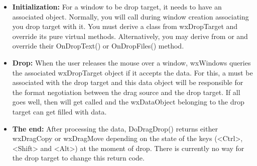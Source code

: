 \begin{itemize}\itemsep=0pt
\item {\bf Initialization:} For a window to be drop target, it needs to have
an associated  object. Normally, you will
call  during window
creation associating you drop target with it. You must derive a class from
wxDropTarget and override its pure virtual methods. Alternatively, you may
derive from  or
 and override their OnDropText()
or OnDropFiles() method.
\item {\bf Drop:} When the user releases the mouse over a window, wxWindows
queries the associated wxDropTarget object if it accepts the data. For this,
a  must be associated with the drop target
and this data object will be responsible for the format negotiation between
the drag source and the drop target. If all goes well, then  
will get called and the wxDataObject belonging to the drop target can get 
filled with data.
\item {\bf The end:} After processing the data, DoDragDrop() returns either
wxDragCopy or wxDragMove depending on the state of the keys (<Ctrl>, <Shift>
and <Alt>) at the moment of drop. There is currently no way for the drop
target to change this return code.
\end{itemize}

